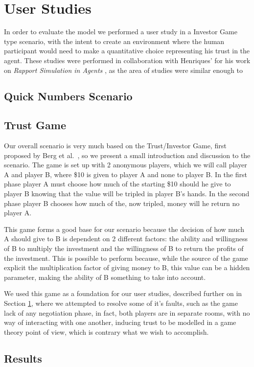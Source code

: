 
\section{User Studies}
\label{sec:UserStudies}

In order to evaluate the model we performed a user study in a Investor Game type scenario, with the intent to create an environment where the human participant would need to make a quantitative choice representing his trust in the agent. These studies were performed in collaboration with Henriques' for his work on \textit{Rapport Simulation in Agents} \cite{todo}, as the area of studies were similar enough to 

\subsection{Quick Numbers Scenario}
\label{subsec:QuickNumbersScenario}


\subsection{Trust Game}
\label{subsec:Trustgame}
Our overall scenario is very much based on the Trust/Investor Game, first proposed by Berg et al.~\cite{JoyceBergJohnDickhaut}, so we present a small introduction and discussion to the scenario. The game is set up with 2 anonymous players, which we will call player A and player B, where \$10 is given to player A and none to player B. In the first phase player A must choose how much of the starting \$10 should he give to player B knowing that the value will be tripled in player B’s hands. In the second phase player B chooses how much of the, now tripled, money will he return no player A.

This game forms a good base for our scenario because the decision of how much A should give to B is dependent on 2 different factors: the ability and willingness of B to multiply the investment and the willingness of B to return the profits of the investment. This is possible to perform because, while the source of the game explicit the multiplication factor of giving money to B, this value can be a hidden parameter, making the ability of B something to take into account.

We used this game as a foundation for our user studies, described further on in Section \ref{sec:UserStudies}, where we attempted to resolve some of it's faults, such as the game lack of any negotiation phase, in fact, both players are in separate rooms, with no way of interacting with one another, inducing trust to be modelled in a game theory point of view, which is contrary what we wish to accomplish.

\subsection{Results}
